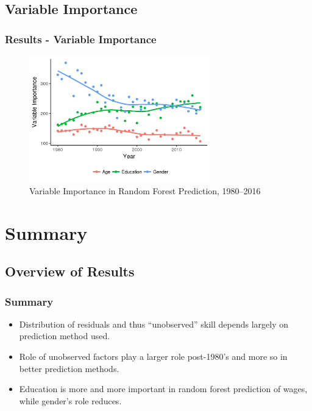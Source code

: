 \documentclass{beamer}
\begin{document}

\subsection{Variable Importance}
\begin{frame}
\frametitle{Results - Variable Importance}
\pause
\begin{figure}  
	\caption{Variable Importance in Random Forest Prediction, 1980--2016}
  \centering
  \includegraphics[width=0.7\textwidth]{importance_graph.png}
\end{figure}
\end{frame}

\section{Summary}
\subsection{Overview of Results}
\begin{frame}
\frametitle{Summary}
\begin{itemize}
\pause
\item Distribution of residuals and thus ``unobserved'' skill depends largely on prediction method used. \vspace{10mm} 
\pause
\item Role of unobserved factors play a larger role post-1980's and more so in better prediction methods. \vspace{10mm} 
\pause
\item Education is more and more important in random forest prediction of wages, while gender's role reduces. \vspace{10mm} 
\end{itemize}
\end{frame}
\end{document}
